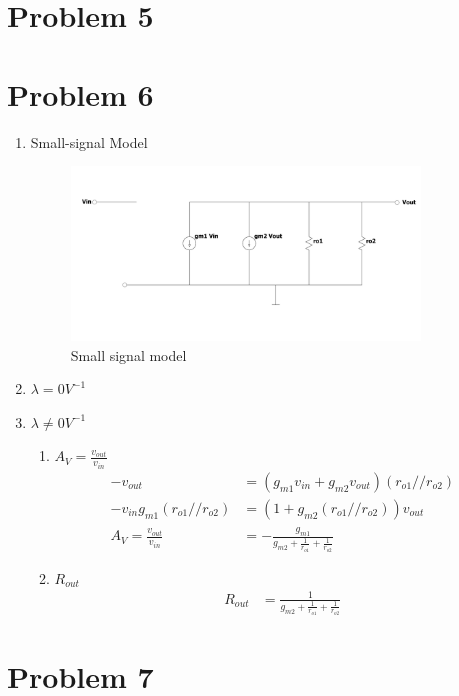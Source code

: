\documentclass{article}
\begin{document}
\section{Problem 5}
\label{sec:org83713d3}

\section{Problem 6}
\label{sec:org1053f6e}
\begin{enumerate}
\item Small-signal Model
\begin{figure}[H]
\centering
\includegraphics[width=350px]{img/q6/a/small-signal-model.pdf}
\caption{\label{fig:small-signal-model}Small signal model}
\end{figure}
\item \(\lambda = 0 V^{-1}\)
\item \(\lambda \neq 0 V^{-1}\)
\begin{enumerate}
\item \(A_{V} = \frac{v_{out}}{v_{in}}\)
\begin{equation*}
\begin{aligned}
-v_{out} &= (g_{m1}v_{in} + g_{m2} v_{out})(r_{o1} // r_{o2}) \\
-v_{in} g_{m1}(r_{o1} // r_{o2}) &= (1 + g_{m2} (r_{o1} // r_{o2}))v_{out} \\
A_{V} = \frac{v_{out}}{v_{in}} &= -\frac{g_{m1}}{g_{m2} + \frac{1}{r_{o1}} + \frac{1}{r_{o2}}}
\end{aligned}
\end{equation*}

\item \(R_{out}\)
\begin{equation*}
\begin{aligned}
R_{out} &= \frac{1}{g_{m2} + \frac{1}{r_{o1}} + \frac{1}{r_{o2}}}
\end{aligned}
\end{equation*}
\end{enumerate}
\end{enumerate}
\section{Problem 7}
\label{sec:org3054950}
\end{document}
